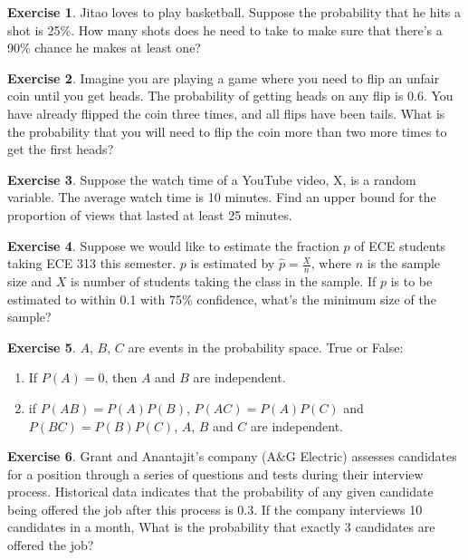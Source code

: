 \documentclass[12pt]{amsart}
\theoremstyle{definition}
\newtheorem{exercise}{Exercise}
\numberwithin{equation}{section}
\theoremstyle{plain}
\begin{document}
\begin{exercise}
    Jitao loves to play basketball. Suppose the probability that he hits a shot is 25\%. How many shots does he need to take to make sure that there’s a 90\% chance he makes at least one? %
\end{exercise}

\begin{exercise}
    Imagine you are playing a game where you need to flip an unfair coin until you get heads. The probability of getting heads on any flip is 0.6. You have already flipped the coin three times, and all flips have been tails. What is the probability that you will need to flip the coin more than two more times to get the first heads? %
\end{exercise}

\begin{exercise}
    Suppose the watch time of a YouTube video, X, is a random variable. The average watch time is 10 minutes. Find an upper bound for the proportion of views that lasted at least 25 minutes. %
\end{exercise}

\begin{exercise}
    Suppose we would like to estimate the fraction $p$ of ECE students taking ECE 313 this semester. $p$ is estimated by $\widehat{p}=\frac{X}{n}$, where $n$ is the sample size and $X$ is number of students taking the class in the sample. If $p$ is to be estimated to within 0.1 with 75\% confidence, what’s the minimum size of the sample? %
\end{exercise}

\begin{exercise}
    $A$, $B$, $C$ are events in the probability space. True or False:
\begin{enumerate}[label=\Alph*.]
        \item If $P(A)=0$, then $A$ and $B$ are independent.
        \item if $P(AB) = P(A)P(B)$, $P(AC) = P(A)P(C)$ and $P(BC) = P(B)P(C)$, $A$, $B$ and $C$ are independent. 
    \end{enumerate}
\end{exercise}

\begin{exercise}
    Grant and Anantajit's company (A\&G Electric) assesses candidates for a position through a series of questions and tests during their interview process. Historical data indicates that the probability of any given candidate being offered the job after this process is 0.3. If the company interviews 10 candidates in a month, What is the probability that exactly 3 candidates are offered the job?%
\end{exercise}
\end{document}
